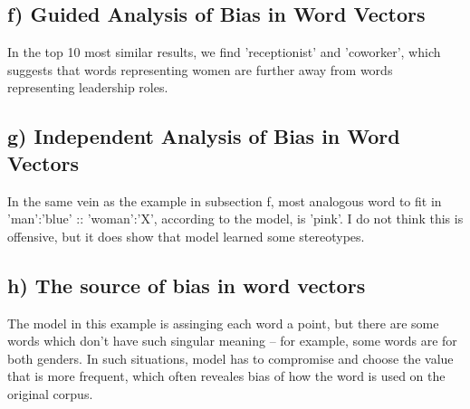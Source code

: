 \documentclass[12pt]{article}
\begin{document}
\subsection*{f) Guided Analysis of Bias in Word Vectors}
In the top 10 most similar results, we find 'receptionist' and 'coworker', which 
suggests that words representing women are further away from words representing 
leadership roles.

\subsection*{g) Independent Analysis of Bias in Word Vectors}
In the same vein as the example in subsection f, most analogous word to fit in 
'man':'blue' :: 'woman':'X', according to the model, is 'pink'. I do not think 
this is offensive, but it does show that model learned some stereotypes.

\subsection*{h) The source of bias in word vectors}
The model in this example is assinging each word a point, but there are some 
words which don't have such singular meaning -- for example, some words are for 
both genders. In such situations, model has to compromise and choose the value 
that is more frequent, which often reveales bias of how the word is used on the 
original corpus.
 
 
\end{document}
